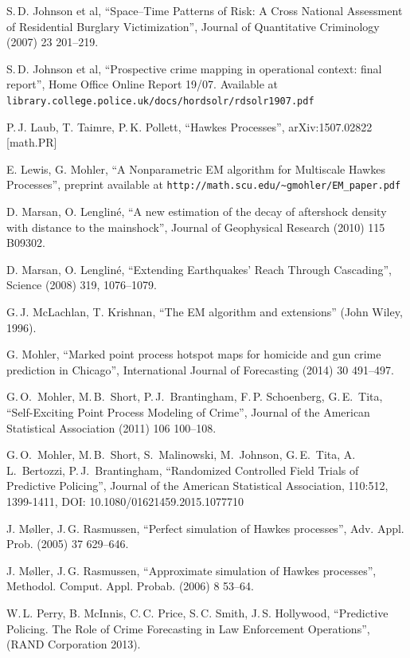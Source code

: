 \documentclass[twoside,a4paper]{article}
\theoremstyle{plain}
\theoremstyle{definition}
\begin{document}
\begin{thebibliography}{99}
 S.\,D. Johnson et al,
	``Space--Time Patterns of Risk: A Cross National Assessment of
	Residential Burglary Victimization'',
	Journal of Quantitative Criminology (2007) 23 201--219.
	
 S.\,D. Johnson et al,
	``Prospective crime mapping in operational context: final report'',
	Home Office Online Report 19/07.  Available at
	\texttt{library.college.police.uk/docs/hordsolr/rdsolr1907.pdf}

 P.\,J. Laub, T. Taimre, P.\,K. Pollett,
	``Hawkes Processes'', arXiv:1507.02822 [math.PR]

 E. Lewis, G. Mohler,
	``A Nonparametric EM algorithm for Multiscale Hawkes Processes'',
	preprint available at \texttt{http://math.scu.edu/\textasciitilde gmohler/EM\_paper.pdf}

 D. Marsan, O. Lenglin\'e,
	``A new estimation of the decay of aftershock density with distance to the mainshock'',
	Journal of Geophysical Research (2010) 115 B09302.

 D. Marsan, O. Lenglin\'e,
	``Extending Earthquakes' Reach Through Cascading'',
	Science (2008) 319, 1076--1079.

 G.\,J. McLachlan, T. Krishnan, ``The EM algorithm and extensions''
	(John Wiley, 1996).
	
 G. Mohler, ``Marked point process hotspot maps for homicide and
gun crime prediction in Chicago'',
	International Journal of Forecasting (2014) 30 491--497.

 G.\,O.~Mohler, M.\,B.~Short, P.\,J.~Brantingham, F.\,P. Schoenberg, G.\,E.~Tita,
	``Self-Exciting Point Process Modeling of Crime'',
	Journal of the American Statistical Association (2011) 106 100--108.

 G.\,O.~Mohler, M.\,B.~Short, S.~Malinowski, M.~Johnson, G.\,E.~Tita, 
   A.\,L.~Bertozzi, P.\,J.~Brantingham,
   ``Randomized Controlled Field Trials of Predictive Policing'',
   Journal of the American Statistical Association, 110:512, 1399-1411, DOI:
	10.1080/01621459.2015.1077710

 J. M\o ller, J.\,G. Rasmussen,
	``Perfect simulation of Hawkes processes'',
	Adv. Appl. Prob. (2005) 37 629--646.

 J. M\o ller, J.\,G. Rasmussen,
	``Approximate simulation of Hawkes processes'',
	Methodol. Comput. Appl. Probab. (2006) 8 53--64.

 W.\,L. Perry, B. McInnis, C.\,C. Price, S.\,C. Smith, J.\,S. Hollywood,
        ``Predictive Policing. The Role of Crime Forecasting in Law Enforcement Operations'',
        (RAND Corporation 2013).


\end{thebibliography}
\end{document}
